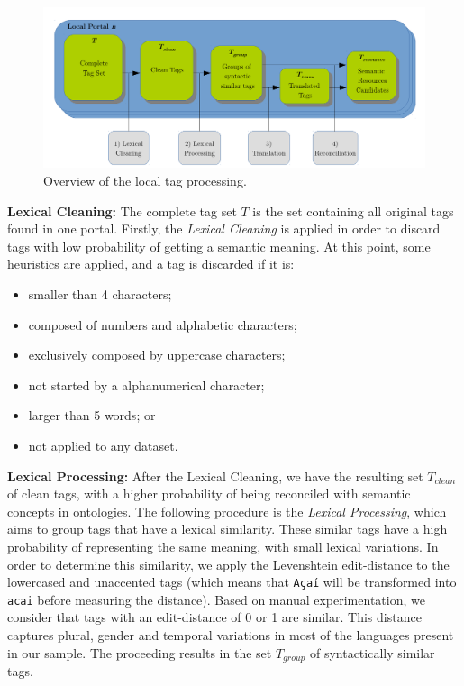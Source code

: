 \begin{figure}[b]
\begin{center}
\includegraphics[width=\columnwidth]{images/local_processing.pdf}
\caption{Overview of the local tag processing.}
\label{fig:local_processing}
\end{center}
\end{figure}

\noindent \textbf{Lexical Cleaning: }The complete tag set $T$ is the set containing all original tags found in one portal.
Firstly, the \emph{Lexical Cleaning} is applied in order to discard tags with low probability of getting a semantic meaning.
At this point, some heuristics are applied, and a tag is discarded if it is: 
\begin{itemize}
	\item smaller than 4 characters; 
	\item composed of numbers and alphabetic characters;
	\item exclusively composed by uppercase characters;
	\item not started by a alphanumerical character;
	\item larger than 5 words; or
	\item not applied to any dataset.
\end{itemize}

\noindent \textbf{Lexical Processing:} After the Lexical Cleaning, we have the resulting set $T_{clean}$ of clean tags, with a higher probability of being reconciled with semantic concepts in ontologies.
The following procedure is the \emph{Lexical Processing}, which aims to group tags that have a lexical similarity.
These similar tags have a high probability of representing the same meaning, with small lexical variations.
In order to determine this similarity, we apply the Levenshtein edit-distance to the lowercased and unaccented tags (which means that \texttt{Açaí} will be transformed into \texttt{acai} before measuring the distance).
Based on manual experimentation, we consider that tags with an edit-distance of 0 or 1 are similar.
This distance captures plural, gender and temporal variations in most of the languages present in our sample.
The proceeding results in the set $T_{group}$ of syntactically similar tags.

